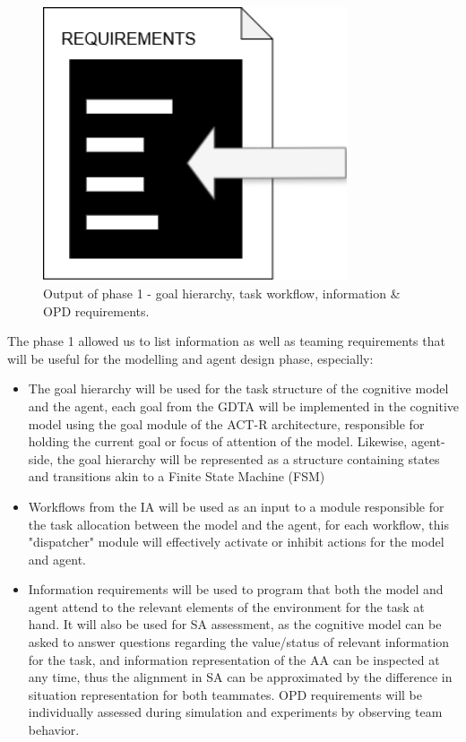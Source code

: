 \documentclass[12pt,a4paper]{article} %
\begin{document}
\begin{figure}[H]
\begin{minipage}[b]{0.3\textwidth}
			\includegraphics[width=0.8\textwidth]{images/requirements.png}
		\end{minipage}
		\caption{Output of phase 1 - goal hierarchy, task workflow, information \& OPD requirements.}
		\label{fig:logos}
	\end{figure}

	The phase 1 allowed us to list information as well as teaming requirements that will be useful for the modelling and agent design phase, especially:

	\begin{itemize}
		\item The goal hierarchy will be used for the task structure of the cognitive model and the agent, each goal from the GDTA will be implemented in the cognitive model using the goal module of the ACT-R architecture, responsible for holding the current goal or focus of attention of the model. Likewise, agent-side, the goal hierarchy will be represented as a structure containing states and transitions akin to a Finite State Machine (FSM)
		\item Workflows from the IA will be used as an input to a module responsible for the task allocation between the model and the agent, for each workflow, this "dispatcher" module will effectively activate or inhibit actions for the model and agent.
		\item Information requirements will be used to program that both the model and agent attend to the relevant elements of the environment for the task at hand. It will also be used for SA assessment, as the cognitive model can be asked to answer questions regarding the value/status of relevant information for the task, and information representation of the AA can be inspected at any time, thus the alignment in SA can be approximated by the difference in situation representation for both teammates. OPD requirements will be individually assessed during simulation and experiments by observing team behavior.
	\end{itemize}
\end{document}
